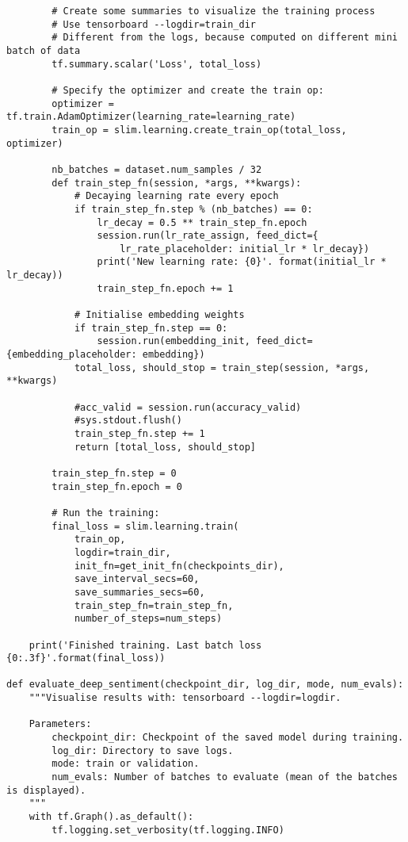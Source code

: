 \begin{lstlisting}
        # Create some summaries to visualize the training process
        # Use tensorboard --logdir=train_dir
        # Different from the logs, because computed on different mini batch of data
        tf.summary.scalar('Loss', total_loss)
      
        # Specify the optimizer and create the train op:
        optimizer = tf.train.AdamOptimizer(learning_rate=learning_rate)
        train_op = slim.learning.create_train_op(total_loss, optimizer)

        nb_batches = dataset.num_samples / 32
        def train_step_fn(session, *args, **kwargs):
            # Decaying learning rate every epoch
            if train_step_fn.step % (nb_batches) == 0:
                lr_decay = 0.5 ** train_step_fn.epoch
                session.run(lr_rate_assign, feed_dict={
                    lr_rate_placeholder: initial_lr * lr_decay})
                print('New learning rate: {0}'. format(initial_lr * lr_decay))
                train_step_fn.epoch += 1

            # Initialise embedding weights
            if train_step_fn.step == 0:
                session.run(embedding_init, feed_dict={embedding_placeholder: embedding})
            total_loss, should_stop = train_step(session, *args, **kwargs)

            #acc_valid = session.run(accuracy_valid)
            #sys.stdout.flush()
            train_step_fn.step += 1
            return [total_loss, should_stop]
        
        train_step_fn.step = 0
        train_step_fn.epoch = 0

        # Run the training:
        final_loss = slim.learning.train(
            train_op,
            logdir=train_dir,
            init_fn=get_init_fn(checkpoints_dir),
            save_interval_secs=60,
            save_summaries_secs=60,
            train_step_fn=train_step_fn,
            number_of_steps=num_steps)
            
    print('Finished training. Last batch loss {0:.3f}'.format(final_loss))

def evaluate_deep_sentiment(checkpoint_dir, log_dir, mode, num_evals):
    """Visualise results with: tensorboard --logdir=logdir.
    
    Parameters:
        checkpoint_dir: Checkpoint of the saved model during training.
        log_dir: Directory to save logs.
        mode: train or validation.
        num_evals: Number of batches to evaluate (mean of the batches is displayed).
    """
    with tf.Graph().as_default():
        tf.logging.set_verbosity(tf.logging.INFO)


\end{lstlisting}
